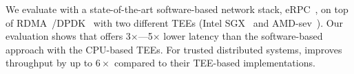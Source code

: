 


We evaluate \projecttitle{} with a  state-of-the-art software-based network stack, eRPC~\cite{erpc}, on top of RDMA~\cite{rdma}/DPDK~\cite{dpdk} with two different TEEs (Intel SGX~\cite{intel-sgx} and AMD-sev~\cite{amd-sev}). Our evaluation shows that \projecttitle{} offers 3$\times$---5$\times$ lower latency than the software-based approach with the CPU-based TEEs. For trusted distributed systems, \projecttitle{} improves throughput by up to $6\times$ compared to their TEE-based implementations.


